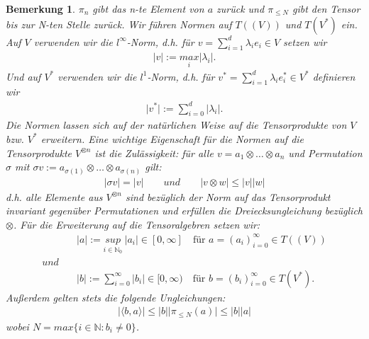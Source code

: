 \documentclass[12pt,titlepage,headsepline]{article}
\newtheorem*{bemerkung*}{Bemerkung}
\begin{document}
      \begin{bemerkung*}
        \hfill\break
        \textup{
        $\pi_n$ gibt das n-te Element von $a$ zurück und $\pi_{\leq N}$ gibt den Tensor bis zur N-ten Stelle zurück.
        \hfill\break
        Wir führen Normen auf $T((V))$ und $T(V^*)$ ein. Auf $V$ verwenden wir die $l^{\infty}$-Norm, d.h. für $v = \sum^{d}_{i=1}\lambda_ie_i \in V$ setzen wir
        \begin{align*}
          \lvert v \rvert := \underset{i}{max}\lvert \lambda_i \rvert.
        \end{align*}
        Und auf $V^*$ verwenden wir die $l^1$-Norm, d.h. für $v^* = \sum^{d}_{i=1}\lambda_ie^*_i \in V^*$ definieren wir
        \begin{align*}
          \lvert v^* \rvert := \sum_{i=0}^{d}\lvert \lambda_i \rvert.
        \end{align*}
        Die Normen lassen sich auf der natürlichen Weise auf die Tensorprodukte von $V$ bzw. $V^*$ erweitern. Eine wichtige Eigenschaft für die Normen auf die Tensorprodukte $V^{\otimes n}$ ist \textit{die Zulässigkeit}:
        für alle $v = a_1 \otimes \ldots \otimes a_n$ und Permutation $\sigma$ mit $\sigma v := a_{\sigma(1)} \otimes \ldots \otimes a_{\sigma(n)}$ gilt:
        \begin{align*}
          \lvert \sigma v \rvert = \lvert v \rvert
          \qquad und \qquad
          \lvert v \otimes w \rvert \leq \lvert v \rvert \lvert w \rvert
        \end{align*}
        d.h. alle Elemente aus $V^{\otimes n}$ sind bezüglich der Norm auf das Tensorprodukt invariant gegenüber Permutationen und erfüllen die Dreiecksungleichung bezüglich $\otimes$.
        Für die Erweiterung auf die Tensoralgebren setzen wir:
        \begin{align*}
          & \lvert a \rvert := \underset{i \in \mathbb{N}_0}{sup} \ \lvert a_i \rvert \in [0,\infty] \quad \text{für } a=(a_i)^{\infty}_{i=0} \in T((V)) \\
          und \quad & \\
          & \lvert b \rvert := \sum^{\infty}_{i=0}\lvert b_i \rvert \in [0,\infty) \quad \text{für } b=(b_i)^{\infty}_{i=0} \in T(V^*).
        \end{align*}
        Außerdem gelten stets die folgende Ungleichungen:
        \begin{align*}
          \lvert \langle b,a \rangle \rvert \leq \lvert b \rvert \lvert \pi_{\leq N}(a)\rvert \leq \lvert b \rvert \lvert a \rvert
        \end{align*}
        wobei $N = max\{i \in \mathbb{N} : b_i \neq 0 \}$.
        }
      \end{bemerkung*}
\end{document}
